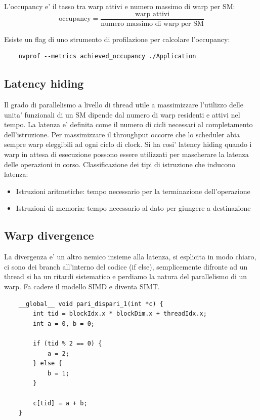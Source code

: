 L'occupancy e' il tasso tra warp attivi e numero massimo di warp per SM:
\[
\text{occupancy} = \frac{\text{warp attivi}}{\text{numero massimo di warp per SM}}
\]

Esiste un flag di uno strumento di profilazione per calcolare l'occupancy:
\begin{lstlisting}
    nvprof --metrics achieved_occupancy ./Application
\end{lstlisting}

\subsection{Latency hiding}
Il grado di parallelismo a livello di thread utile a massimizzare l'utilizzo delle unita' funzionali di un SM dipende dal numero di warp residenti e attivi nel tempo. 
La latenza e' definita come il numero di cicli necessari al completamento dell'istruzione. Per massimizzare il throughput occorre che lo scheduler abia sempre warp eleggibili ad ogni ciclo di clock. Si ha cosi' latency hiding quando i warp in attesa di esecuzione possono essere utilizzati per mascherare la latenza delle operazioni in corso.
Classificazione dei tipi di istruzione che inducono latenza:
\begin{itemize}
    \item Istruzioni aritmetiche: tempo necessario per la terminazione dell'operazione
    \item Istruzioni di memoria: tempo necessario al dato per giungere a destinazione
\end{itemize}

\subsection{Warp divergence}
La divergenza e' un altro nemico insieme alla latenza, si esplicita in modo chiaro, ci sono dei branch all'interno del codice (if else), semplicemente difronte ad un thread si ha un ritardi sistematico e perdiamo la natura del parallelismo di un warp. Fa cadere il modello SIMD e diventa SIMT.

\begin{lstlisting}
    __global__ void pari_dispari_1(int *c) {
        int tid = blockIdx.x * blockDim.x + threadIdx.x;
        int a = 0, b = 0;

        if (tid % 2 == 0) {
            a = 2;
        } else {
            b = 1;
        }

        c[tid] = a + b;
    }
\end{lstlisting}

